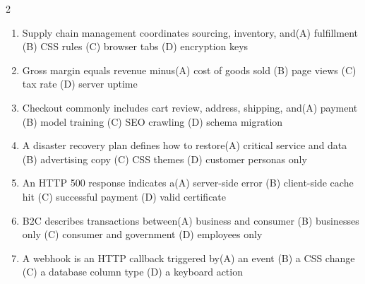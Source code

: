 \documentclass[a4paper]{article}
\begin{document}
\begin{multicols*}{2}
\begin{enumerate}
\item Supply chain management coordinates sourcing, inventory, and\newline\hspace*{0.6em}(A) fulfillment \quad (B) CSS rules \newline\hspace*{0.6em}(C) browser tabs \quad (D) encryption keys
\item Gross margin equals revenue minus\newline\hspace*{0.6em}(A) cost of goods sold \quad (B) page views \newline\hspace*{0.6em}(C) tax rate \quad (D) server uptime
\item Checkout commonly includes cart review, address, shipping, and\newline\hspace*{0.6em}(A) payment \quad (B) model training \newline\hspace*{0.6em}(C) SEO crawling \quad (D) schema migration
\item A disaster recovery plan defines how to restore\newline\hspace*{0.6em}(A) critical service and data \quad (B) advertising copy \newline\hspace*{0.6em}(C) CSS themes \quad (D) customer personas only
\item An HTTP 500 response indicates a\newline\hspace*{0.6em}(A) server-side error \quad (B) client-side cache hit \newline\hspace*{0.6em}(C) successful payment \quad (D) valid certificate
\item B2C describes transactions between\newline\hspace*{0.6em}(A) business and consumer \quad (B) businesses only \newline\hspace*{0.6em}(C) consumer and government \quad (D) employees only
\item A webhook is an HTTP callback triggered by\newline\hspace*{0.6em}(A) an event \quad (B) a CSS change \newline\hspace*{0.6em}(C) a database column type \quad (D) a keyboard action

\end{enumerate}
\end{multicols*}
\end{document}
